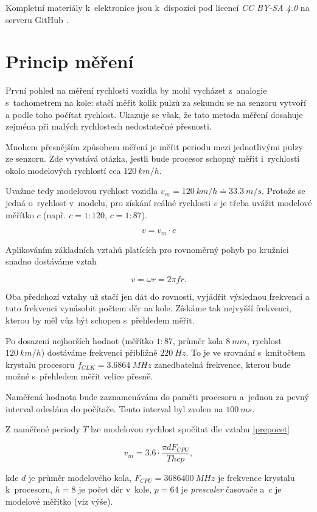 Kompletní materiály k~elektronice jsou k~dispozici pod licencí \textit{CC BY-SA
4.0} na serveru GitHub \cite{wsm-pcb}.

\section{Princip měření}
\label{sec:wsm-mer-princip}

První pohled na měření rychlosti vozidla by mohl vycházet z~analogie
s~tachometrem na kole: stačí měřit kolik pulzů za sekundu se na senzoru vytvoří
a podle toho počítat rychlost. Ukazuje se však, že tato metoda měření dosahuje
zejména při malých rychlostech nedostatečné přesnosti.

Mnohem přesnějším způsobem měření je měřit periodu mezi jednotlivými pulzy ze
senzoru. Zde vyvstává otázka, jestli bude procesor schopný měřit i~rychlosti
okolo modelových rychlostí cca $120\ km/h$.

Uvažme tedy modelovou rychlost vozidla $v_m = 120\ km/h \doteq 33.3\ m/s$.
Protože se jedná o~rychlost v~modelu, pro získání reálné rychlosti $v$ je třeba
uvážit modelové měřítko $c$ (např. $c = 1:120$, $c = 1:87$).

$$v = v_m \cdot c$$

Aplikováním základních vztahů platících pro rovnoměrný pohyb po kružnici snadno
dostáváme vztah

$$v = \omega r = 2 \pi f r.$$

Oba předchozí vztahy už stačí jen dát do rovnosti, vyjádřit výslednou frekvenci
a tuto frekvenci vynásobit počtem děr na kole. Získáme tak nejvyšší frekvenci,
kterou by měl vůz být schopen s~přehledem měřit.

Po dosazení nejhorších hodnot (měřítko $1:87$, průměr kola $8\ mm$, rychlost
$120\ km/h$) dostáváme frekvenci přibližně $220\ Hz$. To je ve srovnání
s~kmitočtem krystalu procesoru $f_{CLK} = 3.6864\ MHz$ zanedbatelná frekvence,
kterou bude možné s~přehledem měřit velice přesně.

Naměřená hodnota bude zaznamenávána do paměti procesoru a~jednou za pevný
interval odeslána do počítače. Tento interval byl zvolen na $100\ ms$.

Z naměřené periody $T$ lze modelovou rychlost spočítat dle vztahu
\ref{prepocet}

\begin{equation}
v_m = 3.6 \cdot \frac{\pi d F_{CPU}}{T h c p},
\label{prepocet}
\end{equation}

kde $d$ je průměr modelového kola, $F_{CPU} = 3686400\ MHz$ je frekvence
krystalu k~procesoru, $h = 8$ je počet děr v~kole, $p = 64$ je
\textit{prescaler} časovače a~$c$ je modelové měřítko (viz výše).

